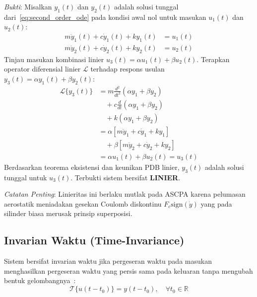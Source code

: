 \documentclass[journal]{IEEEtran}
\begin{document}
\textit{Bukti}: Misalkan $y_1(t)$ dan $y_2(t)$ adalah solusi tunggal dari~\eqref{eq:second_order_ode} pada kondisi awal nol untuk masukan $u_1(t)$ dan $u_2(t)$:
\begin{align}
    m \ddot{y}_1(t) + c \dot{y}_1(t) + k y_1(t) &= u_1(t) \label{eq:lin_1} \\
    m \ddot{y}_2(t) + c \dot{y}_2(t) + k y_2(t) &= u_2(t) \label{eq:lin_2}
\end{align}
Tinjau masukan kombinasi linier $u_3(t) = \alpha u_1(t) + \beta u_2(t)$. Terapkan operator diferensial linier $\mathcal{L}$ terhadap respons usulan $y_3(t) = \alpha y_1(t) + \beta y_2(t)$:
\begin{align}
    \mathcal{L}\{y_3(t)\} &= m \frac{d^2}{dt^2}(\alpha y_1 + \beta y_2) \nonumber \\
    &\quad + c \frac{d}{dt}(\alpha y_1 + \beta y_2) \nonumber \\
    &\quad + k (\alpha y_1 + \beta y_2) \nonumber \\
    &= \alpha \left[ m \ddot{y}_1 + c \dot{y}_1 + k y_1 \right] \nonumber \\
    &\quad + \beta \left[ m \ddot{y}_2 + c \dot{y}_2 + k y_2 \right] \nonumber \\
    &= \alpha u_1(t) + \beta u_2(t) = u_3(t)
    \label{eq:lin_proof}
\end{align}
Berdasarkan teorema eksistensi dan keunikan PDB linier, $y_3(t)$ adalah solusi tunggal untuk $u_3(t)$. Terbukti sistem bersifat \textbf{LINIER}.

\textit{Catatan Penting}: Linieritas ini berlaku mutlak pada ASCPA karena pelumasan aerostatik meniadakan gesekan Coulomb diskontinu $F_c \text{sign}(\dot{y})$ yang pada silinder biasa merusak prinsip superposisi.

\subsection{Invarian Waktu (Time-Invariance)}
Sistem bersifat invarian waktu jika pergeseran waktu pada masukan menghasilkan pergeseran waktu yang persis sama pada keluaran tanpa mengubah bentuk gelombangnya~\cite{oppenheim1997signals}:
\begin{equation}
    \mathcal{T}\{u(t - t_0)\} = y(t - t_0), \quad \forall t_0 \in \mathbb{R}
    \label{eq:ti_def}
\end{equation}
\end{document}
